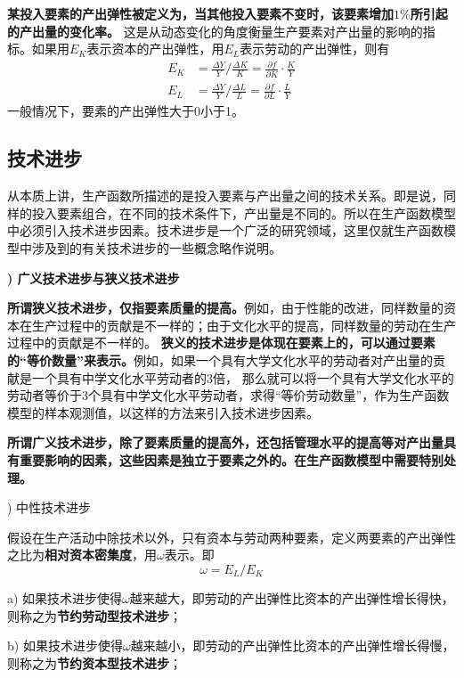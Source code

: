 	\textbf{某投入要素的产出弹性被定义为，当其他投入要素不变时，该要素增加$ 1\% $所引起的产出量的变化率。}
	这是从动态变化的角度衡量生产要素对产出量的影响的指标。如果用$ E_{K} $表示资本的产出弹性，用$ E_{L} $表示劳动的产出弹性，则有
	\begin{equation}
		\begin{aligned}
			E_{K} & = \frac{\Delta Y}{Y} \bigg/ \frac{\Delta K}{K} = \frac{\partial f}{\partial K} \cdot \frac{K}{Y} \\
			E_{L} & = \frac{\Delta Y}{Y} \bigg/ \frac{\Delta L}{L} = \frac{\partial f}{\partial L} \cdot \frac{L}{Y}
		\end{aligned}
	\end{equation}
	一般情况下，要素的产出弹性大于0小于1。
		
\subsection{技术进步}
			
	从本质上讲，生产函数所描述的是投入要素与产出量之间的技术关系。即是说，同样的投入要素组合，在不同的技术条件下，产出量是不同的。所以在生产函数模型中必须引入技术进步因素。技术进步是一个广泛的研究领域，这里仅就生产函数模型中涉及到的有关技术进步的一些概念略作说明。
		
{\bf {}) 广义技术进步与狭义技术进步}

	{\bf{所谓狭义技术进步，仅指要素质量的提高。}}例如，由于性能的改进，同样数量的资本在生产过程中的贡献是不一样的；由于文化水平的提高，同样数量的劳动在生产过程中的贡献是不一样的。
	\textbf{狭义的技术进步是体现在要素上的，可以通过要素的“等价数量”来表示。}例如，如果一个具有大学文化水平的劳动者对产出量的贡献是一个具有中学文化水平劳动者的3倍，
	那么就可以将一个具有大学文化水平的劳动者等价于3个具有中学文化水平劳动者，求得“等价劳动数量”，作为生产函数模型的样本观测值，以这样的方法来引入技术进步因素。
				
	\textbf{所谓广义技术进步，除了要素质量的提高外，还包括管理水平的提高等对产出量具有重要影响的因素，这些因素是独立于要素之外的。在生产函数模型中需要特别处理。}
			
	) 中性技术进步
			
	假设在生产活动中除技术以外，只有资本与劳动两种要素，定义两要素的产出弹性之比为\textbf{相对资本密集度}，用$ \omega $表示。即
	$$ \omega=E_{L} / E_{K} $$
			
	a) 如果技术进步使得$ \omega $越来越大，即劳动的产出弹性比资本的产出弹性增长得快，则称之为\textbf{节约劳动型技术进步}；
			
	b) 如果技术进步使得$ \omega $越来越小，即劳动的产出弹性比资本的产出弹性增长得慢，则称之为\textbf{节约资本型技术进步}；
			
